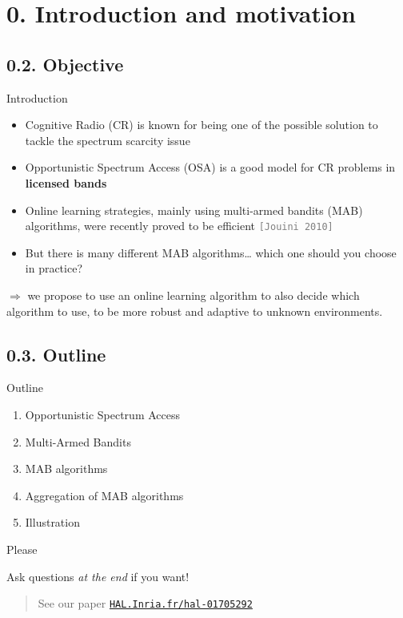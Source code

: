 \documentclass[12pt,english,ignorenonframetext,]{beamer}
\providecommand{\tightlist}{%
  \setlength{\itemsep}{0pt}\setlength{\parskip}{0pt}}
\begin{document}
\section{\hfill{}0. Introduction and motivation\hfill{}}

\subsection{\hfill{}0.2. Objective\hfill{}}

\begin{frame}[fragile]{%
\protect\hypertarget{introduction}{%
Introduction}}

\begin{itemize}
\item
  Cognitive Radio (CR) is known for being one of the possible solution
  to tackle the spectrum scarcity issue
\item
  Opportunistic Spectrum Access (OSA) is a good model for CR problems in
  \textbf{licensed bands}
\item
  Online learning strategies, mainly using multi-armed bandits (MAB)
  algorithms, were recently proved to be efficient
  \textcolor{gray}{\texttt{[Jouini 2010]}}
\item
  But there is many different MAB algorithms\ldots{} which one should
  you choose in practice?
\end{itemize}

\(\Longrightarrow\) we propose to use an online learning algorithm to
also decide which algorithm to use, to be more robust and adaptive to
unknown environments.

\end{frame}



\subsection{\hfill{}0.3. Outline\hfill{}}

\begin{frame}{%
\protect\hypertarget{outline}{%
Outline}}

\begin{enumerate}
[1.]
\tightlist
\item
  Opportunistic Spectrum Access
\item
  Multi-Armed Bandits
\item
  MAB algorithms
\item
  Aggregation of MAB algorithms
\item
  Illustration
\end{enumerate}

\begin{block}{Please}

Ask questions \emph{at the end} if you want!

\end{block}


\begin{quote}
See our paper
\href{https://hal.inria.fr/hal-01705292}{\texttt{HAL.Inria.fr/hal-01705292}}
\end{quote}

\end{frame}
\end{document}

